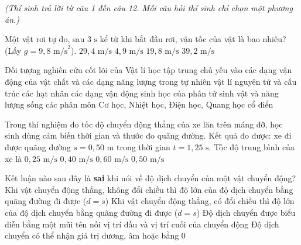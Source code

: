 
\vspace{0.15cm}
\begin{flushleft}
	{\color{blue!50!green}}
	\textit{\small (Thí sinh trả lời từ câu 1 đến câu 12. Mỗi câu hỏi thí sinh chỉ chọn một phương án.)}
\end{flushleft}
\setcounter{ex}{0}
\setcounter{bt}{0}

\begin{ex}
	Một vật rơi tự do, sau $3\text{ s}$ kể từ khi bắt đầu rơi, vận tốc của vật là bao nhiêu? (Lấy $g = 9{,}8\text{ m/s}^2$).
	\choice
	{\True $29{,}4\text{ m/s}$}
	{$4{,}9\text{ m/s}$}
	{$19{,}8\text{ m/s}$}
	{$39{,}2\text{ m/s}$}
\end{ex}

\begin{ex}
	Đối tượng nghiên cứu cốt lõi của Vật lí học tập trung chủ yếu vào
	\choice
	{\True các dạng vận động của vật chất và các dạng năng lượng trong tự nhiên}
	{vật lí nguyên tử và cấu trúc các hạt nhân}
	{các dạng vận động sinh học của phân tử sinh vật và năng lượng sống}
	{các phân môn Cơ học, Nhiệt học, Điện học, Quang học cổ điển}
\end{ex}

\begin{ex}
	Trong thí nghiệm đo tốc độ chuyển động thẳng của xe lăn trên máng đỡ, học sinh dùng cảm biến thời gian và thước đo quãng đường. Kết quả đo được: xe đi được quãng đường $s = 0{,}50\text{ m}$ trong thời gian $t = 1{,}25\text{ s}$. Tốc độ trung bình của xe là
	\choice
	{$0{,}25\text{ m/s}$}
	{\True $0{,}40\text{ m/s}$}
	{$0{,}60\text{ m/s}$}
	{$0{,}50\text{ m/s}$}
\end{ex}

\begin{ex}
	Kết luận nào sau đây là \textbf{sai} khi nói về độ dịch chuyển của một vật chuyển động?
	\choice
	{Khi vật chuyển động thẳng, không đổi chiều thì độ lớn của độ dịch chuyển bằng quãng đường đi được ($d = s$)}
	{\True Khi vật chuyển động thẳng, có đổi chiều thì độ lớn của độ dịch chuyển bằng quãng đường đi được ($d = s$)}
	{Độ dịch chuyển được biểu diễn bằng một mũi tên nối vị trí đầu và vị trí cuối của chuyển động}
	{Độ dịch chuyển có thể nhận giá trị dương, âm hoặc bằng $0$}
\end{ex}


